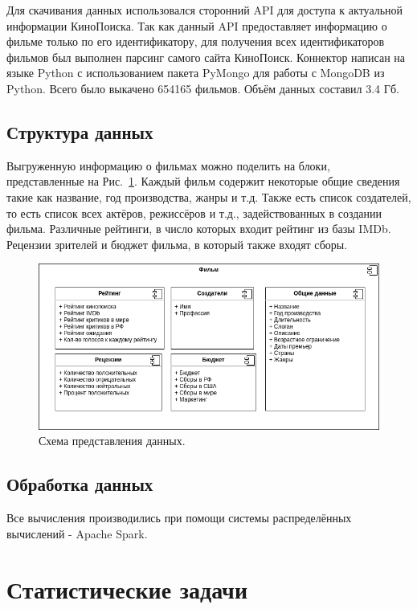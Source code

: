 \documentclass[9pt,conference]{IEEEtran}
\begin{document}
Для скачивания данных использовался сторонний API для доступа к актуальной информации КиноПоиска. Так как данный API предоставляет информацию о фильме только по его идентификатору, для получения всех идентификаторов фильмов был выполнен парсинг самого сайта КиноПоиск. Коннектор написан на языке Python с использованием пакета PyMongo для работы с MongoDB из Python. Всего было выкачено 654165 фильмов. Объём данных составил 3.4 Гб.

\subsection{Структура данных}

Выгруженную информацию о фильмах можно поделить на блоки, представленные на Рис.~\ref{fig:1}. Каждый фильм содержит некоторые общие сведения такие как название, год производства, жанры и т.д. Также есть список создателей, то есть список всех актёров, режиссёров и т.д., задействованных в создании фильма. Различные рейтинги, в число которых входит рейтинг из базы IMDb. Рецензии зрителей и бюджет фильма, в который также входят сборы.

\begin{figure}[ht!]
	\includegraphics[width=\linewidth]{../report/images/dataStructure}
	\caption{Схема представления данных.}
	\label{fig:1}
\end{figure}

\subsection{Обработка данных}

Все вычисления производились при помощи системы распределённых вычислений - Apache Spark.


\section{Статистические задачи}
\end{document}

